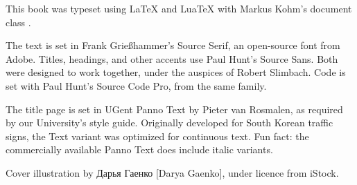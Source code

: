 \documentclass[main]{subfiles}
\begin{document}
\vspace*{\fill}

\begin{small}
    This book was typeset using {\LaTeX} and {Lua\TeX} with Markus Kohm's document class {\KOMAScript}.

    The text is set in Frank Grießhammer's Source Serif, an open-source font from Adobe.
    Titles, headings, and other accents use Paul Hunt's {\sffamily Source Sans}.
    Both were designed to work together, under the auspices of Robert Slimbach.
    Code is set with Paul Hunt's {\ttfamily Source Code Pro}, from the same family.

    The title page is set in {\panno\selectfont UGent Panno Text} by Pieter van Rosmalen,
    as required by our University's style guide.
    Originally developed for South Korean traffic signs, the Text variant was optimized for continuous text.
    Fun fact: the commercially available Panno Text does include italic variants.

    Cover illustration by Дарья Гаенко [Darya Gaenko], under licence from iStock.
\end{small}
\end{document}
